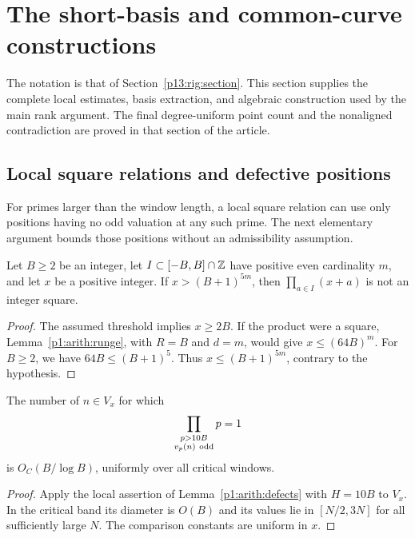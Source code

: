 \section{The short-basis and common-curve constructions}
\label{p14:comp:rigidity}

The notation is that of Section~\ref{p13:rig:section}.  This section
supplies the complete local estimates, basis extraction, and algebraic
construction used by the main rank argument.  The final
degree-uniform point count and the nonaligned contradiction are proved
in that section of the article.

\subsection{Local square relations and defective positions}

For primes larger than the window length, a local square relation
can use only positions having no odd valuation at any such prime.
The next elementary argument bounds those positions without an
admissibility assumption.

\begin{lemma}
\label{p13:rig:local-square}
Let $B\ge2$ be an integer, let $I\subset[-B,B]\cap\mathbb Z$ have positive even
cardinality $m$, and let $x$ be a positive integer.  If
$x>(B+1)^{5m}$, then $\prod_{a\in I}(x+a)$ is not an integer
square.
\end{lemma}

\begin{proof}
The assumed threshold implies $x\ge2B$.
If the product were a square, Lemma~\ref{p1:arith:runge},
with $R=B$ and $d=m$, would give $x\le(64B)^m$.
For $B\ge2$, we have $64B\le(B+1)^5$.
Thus $x\le(B+1)^{5m}$,
contrary to the hypothesis.
\end{proof}

\begin{lemma}
\label{p13:rig:defective}
The number of $n\in V_x$ for which
\[
             \prod_{\substack{p>10B\\v_p(n)\ {\rm odd}}}p=1
\]
is $O_C(B/\log B)$, uniformly over all critical windows.
\end{lemma}

\begin{proof}
Apply the local assertion of Lemma~\ref{p1:arith:defects}
with $H=10B$ to $V_x$.
In the critical band its diameter is $O(B)$ and its values
lie in $[N/2,3N]$ for all sufficiently large $N$.
The comparison constants are uniform in $x$.
\end{proof}

